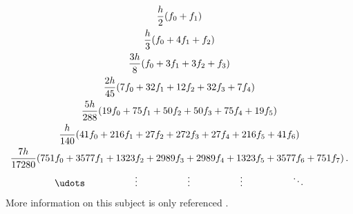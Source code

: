 \begin{gather}
    \frac{h}{2}(f_0 + f_1) \nonumber \\
    \frac{h}{3}(f_0+4f_1+f_2) \nonumber \\
    \frac{3h}{8}(f_0 + 3f_1 + 3f_2 + f_3) \nonumber \\
    \frac{2h}{45}(7f_0 + 32f_1 + 12f_2 + 32f_3 + 7f_4) \nonumber \\
    \frac{5h}{288}(19f_0 + 75f_1 + 50f_2 + 50f_3 + 75f_4 + 19f_5) \nonumber \\
    \frac{h}{140}(41f_0 + 216f_1 + 27f_2 + 272f_3 + 27f_4 + 216f_5 + 41f_6) \nonumber \\
    \frac{7h}{17280}(751f_0 + 3577f_1 + 1323f_2 + 2989f_3 + 2989f_4 + 1323f_5 + 3577f_6 + 751f_7) \,. \nonumber \\
    \udots \hspace{5em} \vdots \hspace{5em} \vdots \hspace{5em} \vdots \hspace{5em} \ddots \label{eq:newton_cotes}
\end{gather}
More information on this subject is only referenced \cite{cotesian1, cotesian2}.


